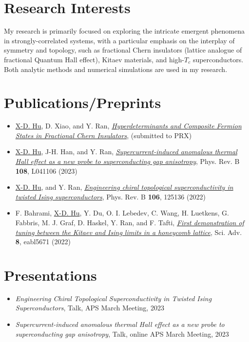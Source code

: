 \documentclass[10pt, letterpaper]{article}
\begin{document}
\section*{Research Interests}
My research is primarily focused on exploring the intricate emergent phenomena in strongly-correlated systems, with a particular emphasis on the interplay of symmetry and topology, such as fractional Chern insulators (lattice analogue of fractional Quantum Hall effect), Kitaev materials, and high-$T_c$ superconductors. Both analytic methods and numerical simulations are used in my research.

\section*{Publications/Preprints}
\begin{itemize}
    \item \underline{X-D. Hu}, D. Xiao, and Y. Ran, \href{https://arxiv.org/abs/2312.00636v2}{\emph{Hyperdeterminants and Composite Fermion States in Fractional Chern Insulators}},  (submitted to PRX)
    \item \underline{X-D. Hu}, J-H. Han, and Y. Ran, \href{https://journals.aps.org/prb/abstract/10.1103/PhysRevB.108.L041106}{\emph{Supercurrent-induced anomalous thermal Hall effect as a new probe to superconducting gap anisotropy}}, Phys. Rev. B \textbf{108}, L041106 (2023)
    \item \underline{X-D. Hu}, and Y. Ran, \href{https://journals.aps.org/prb/abstract/10.1103/PhysRevB.106.125136}{\emph{Engineering chiral topological superconductivity in twisted Ising superconductors}}, Phys. Rev. B \textbf{106}, 125136 (2022)
    \item F. Bahrami, \underline{X-D. Hu}, Y. Du, O. I. Lebedev, C. Wang, H. Luetkens, G. Fabbris, M. J. Graf, D. Haskel, Y. Ran, and F. Tafti, \href{https://www.science.org/doi/full/10.1126/sciadv.abl5671}{\emph{First demonstration of tuning between the Kitaev and Ising limits in a honeycomb lattice}}, Sci. Adv. \textbf{8}, eabl5671 (2022)
\end{itemize}


\section*{Presentations}
\begin{itemize}
    \item \emph{Engineering Chiral Topological Superconductivity in Twisted Ising Superconductors}, Talk, APS March Meeting, 2023
    \item \emph{Supercurrent-induced anomalous thermal Hall effect as a new probe to superconducting gap anisotropy}, Talk, online APS March Meeting, 2023
\end{itemize}
\end{document}
